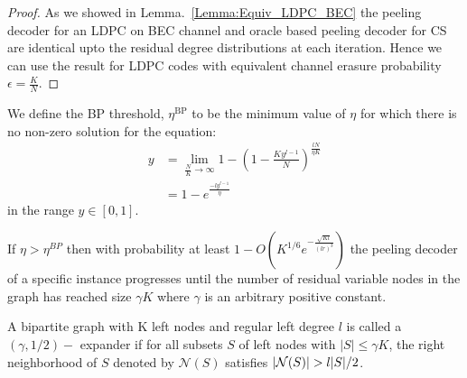 \begin{proof}
As we showed in Lemma.~\ref{Lemma:Equiv_LDPC_BEC} the peeling decoder for an LDPC on BEC channel and oracle based peeling decoder for CS are identical upto the residual degree distributions at each iteration. Hence we can use the result for LDPC codes \cite[Theorem~3.107]{richardson2008modern} with equivalent channel erasure probability $\epsilon=\frac{K}{N}$.
\end{proof}

\begin{definition}[BP Threshold]
We define the BP threshold, $\eta^{\text{BP}}$ to be the minimum value of $\eta$ for which there is no non-zero solution for the equation:
\begin{align*}
y&=\lim_{\frac{N}{K}\rightarrow\infty}1-\left(1-\frac{Ky^{l-1}}{N}\right)^{\frac{lN}{\eta K}}\\
  &=1-e^{\frac{-ly^{l-1}}{\eta}}
\end{align*}
in the range $y\in [0,1]$.
\end{definition}

\begin{lemma}\cite[Theorem~3.107]{richardson2008modern}
\label{lem:PeelSmallGraph}
If $\eta>\eta^{BP}$ then with probability at least $1-O\left(K^{1/6}e^{-\frac{\sqrt{Kl}}{(lr)^3}}\right)$ the peeling decoder of a specific instance progresses until the number of residual variable nodes in the graph has reached size $\gamma K$ where $\gamma$ is an arbitrary positive constant.
\end{lemma}

\begin{definition}
\label{Def:ExpanderGraph}
A bipartite graph with K left nodes and regular left degree $l$ is called a $(\gamma,1/2)-$ expander if for all subsets $S$ of left nodes with $|S|\leq \gamma K$, the right neighborhood of $S$ denoted by $\mathcal{N}(S)$ satisfies $|\mc{N}(S)|>l|S|/2$.
\end{definition}

